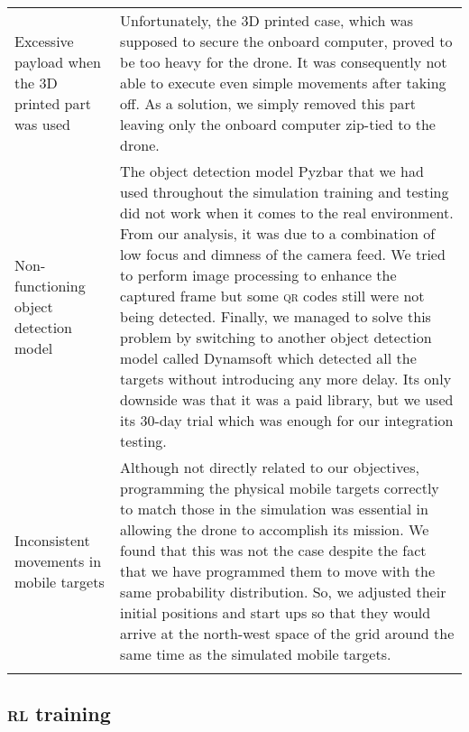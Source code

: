 \documentclass[../main.tex]{subfiles}
\begin{document}
\begin{center}
\begin{xltabular}{\textwidth}{ p{4cm} X }
        \raggedright Excessive payload when the 3D printed part was used
        & 
        Unfortunately, the 3D printed case, which was supposed to
        secure the onboard computer, proved to be too heavy for the
        drone.
        It was consequently not able to execute even simple movements
        after taking off.
        As a solution, we simply removed this part leaving only the
        onboard computer zip-tied to the drone.
        \\ \addlinespace

        \raggedright Non-functioning object detection model 
        & 
        The object detection model Pyzbar that we had used throughout
        the simulation training and testing did not work when it comes
        to the real environment.
        From our analysis, it was due to a combination of low focus
        and dimness of the camera feed.
        We tried to perform image processing to enhance the captured
        frame but some \textsc{qr} codes still were not being
        detected.
        Finally, we managed to solve this problem by switching to
        another object detection model called Dynamsoft which detected
        all the targets without introducing any more delay.
        Its only downside was that it was a paid library, but we used
        its 30-day trial which was enough for our integration testing.
        \\ \addlinespace

        \raggedright Inconsistent movements in mobile targets 
        & 
        Although not directly related to our objectives, programming
        the physical mobile targets correctly to match those in the
        simulation was essential in allowing the drone to accomplish
        its mission.
        We found that this was not the case despite the fact that we
        have programmed them to move with the same probability
        distribution. 
        So, we adjusted their initial positions and start ups so that
        they would arrive at the north-west space of the grid around
        the same time as the simulated mobile targets.
        \\ \addlinespace

        \bottomrule		
    \end{xltabular}
\end{center}
 
\subsection{\textsc{rl} training}
\end{document}
